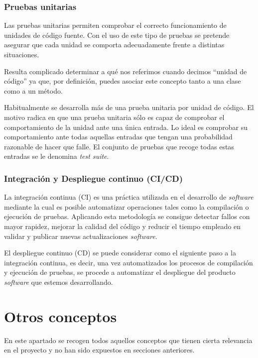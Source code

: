 \subsubsection{Pruebas unitarias}

Las pruebas unitarias permiten comprobar el correcto funcionamiento de
unidades de código fuente. Con el uso de este tipo de pruebas se
pretende asegurar que cada unidad se comporta adecuadamente frente a
distintas situaciones. 

Resulta complicado determinar a qué nos referimos
cuando decimos ``unidad de código'' ya que, por definición, puedes asociar
este concepto tanto a una clase como a un método.

Habitualmente se desarrolla más de una prueba unitaria por unidad de
código. El motivo radica en que una prueba unitaria sólo es capaz de
comprobar el comportamiento de la unidad ante una única entrada. Lo
ideal es comprobar su comportamiento ante todas aquellas entradas que
tengan una probabilidad razonable de hacer que falle. El conjunto de
pruebas que recoge todas estas entradas se le denomina \emph{test
suite}.

\subsubsection{Integración y Despliegue continuo (CI/CD)}

La integración continua (CI) es una práctica utilizada en el desarrollo
de \emph{software} mediante la cual es posible automatizar operaciones
tales como la compilación o ejecución de pruebas. Aplicando esta
metodología se consigue detectar fallos con mayor rapidez, mejorar la
calidad del código y reducir el tiempo empleado en validar y
publicar nuevas actualizaciones \emph{software}.

El despliegue continuo (CD) se puede considerar como el siguiente paso a
la integración continua, es decir, una vez automatizados los procesos de
compilación y ejecución de pruebas, se procede a automatizar el
despliegue del producto \emph{software} que estemos desarrollando.

\section{Otros conceptos}

En este apartado se recogen todos aquellos conceptos que tienen cierta
relevancia en el proyecto y no han sido expuestos en secciones
anteriores.

